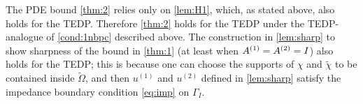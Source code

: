 The PDE bound \cref{thm:2} relies only on \cref{lem:H1}, which, as stated above, also holds for the TEDP. Therefore \cref{thm:2} holds for the TEDP under the TEDP-analogue of \cref{cond:1nbpc} described above. The construction in \cref{lem:sharp} to show sharpness of the bound in \cref{thm:1} (at least when ${A}^{(1)}= {A}^{(2)}= I$) also holds for the TEDP; this is because one can choose the supports of $\chi$ and $\widetilde{\chi}$ to be contained inside $\widetilde{\Omega}$, and then $u^{(1)}$ and $u^{(2)}$ defined in \cref{lem:sharp} satisfy the impedance boundary condition \cref{eq:imp} on $\Gamma_I$.





